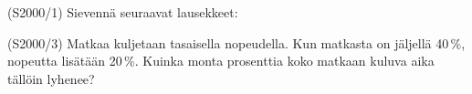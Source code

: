\begin{tehtava}(S2000/1)   Sievennä seuraavat lausekkeet:
\end{tehtava}

\begin{tehtava}(S2000/3)   Matkaa kuljetaan tasaisella nopeudella. Kun matkasta on
                        jäljellä 40\,\%, nopeutta lisätään 20\,\%. Kuinka monta
                        prosenttia koko matkaan kuluva aika tällöin lyhenee?
\end{tehtava}


